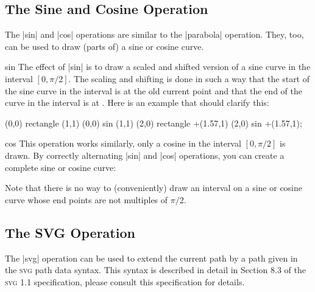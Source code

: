\subsection{The Sine and Cosine Operation}

The |sin| and |cos| operations are similar to the |parabola|
operation. They, too, can be used to draw (parts of) a sine or cosine
curve.

\begin{pathoperation}{sin}{}
  The effect of |sin| is to draw a scaled and shifted version of a sine
  curve in the interval $[0,\pi/2]$. The scaling and shifting is done in
  such a way that the start of the sine curve in the interval is at the
  old current point and that the end of the curve in the interval is at
  . Here is an example that should clarify this:

\begin{codeexample}[]
\tikz \draw (0,0) rectangle (1,1)     (0,0) sin (1,1)
            (2,0) rectangle +(1.57,1) (2,0) sin +(1.57,1);
\end{codeexample}
\end{pathoperation}

\begin{pathoperation}{cos}{}
  This operation works similarly, only a cosine in the interval
  $[0,\pi/2]$ is drawn. By correctly alternating |sin| and |cos|
  operations, you can create a complete sine or cosine curve:

\begin{codeexample}[]
\end{codeexample}
\end{pathoperation}

Note that there is no way to (conveniently) draw an interval on a sine
or cosine curve whose end points are not multiples of $\pi/2$.


\subsection{The SVG Operation}

The |svg| operation can be used to extend the current path by a path
given in the \textsc{svg} path data syntax. This syntax is described
in detail in Section 8.3 of the \textsc{svg 1.1} specification, please
consult this specification for details.

